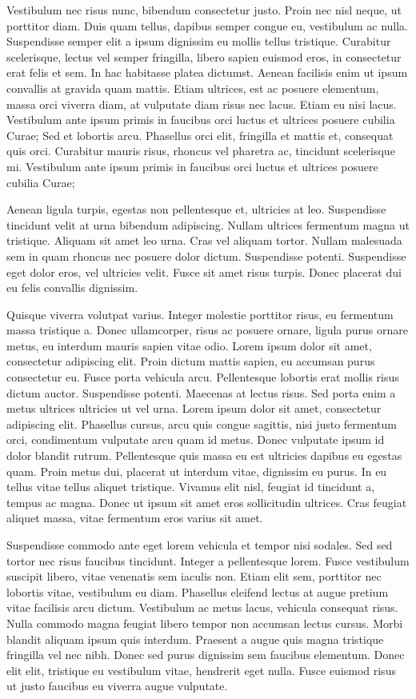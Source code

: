\documentclass[12pt,oneside,final]{siuethesis}
\theoremstyle{definition}
\begin{document}
Vestibulum nec risus nunc, bibendum consectetur justo. Proin nec nisl neque, ut porttitor diam. Duis quam tellus, dapibus semper congue eu, vestibulum ac nulla. Suspendisse semper elit a ipsum dignissim eu mollis tellus tristique. Curabitur scelerisque, lectus vel semper fringilla, libero sapien euismod eros, in consectetur erat felis et sem. In hac habitasse platea dictumst. Aenean facilisis enim ut ipsum convallis at gravida quam mattis. Etiam ultrices, est ac posuere elementum, massa orci viverra diam, at vulputate diam risus nec lacus. Etiam eu nisi lacus. Vestibulum ante ipsum primis in faucibus orci luctus et ultrices posuere cubilia Curae; Sed et lobortis arcu. Phasellus orci elit, fringilla et mattis et, consequat quis orci. Curabitur mauris risus, rhoncus vel pharetra ac, tincidunt scelerisque mi. Vestibulum ante ipsum primis in faucibus orci luctus et ultrices posuere cubilia Curae;

Aenean ligula turpis, egestas non pellentesque et, ultricies at leo. Suspendisse tincidunt velit at urna bibendum adipiscing. Nullam ultrices fermentum magna ut tristique. Aliquam sit amet leo urna. Cras vel aliquam tortor. Nullam malesuada sem in quam rhoncus nec posuere dolor dictum. Suspendisse potenti. Suspendisse eget dolor eros, vel ultricies velit. Fusce sit amet risus turpis. Donec placerat dui eu felis convallis dignissim.

Quisque viverra volutpat varius. Integer molestie porttitor risus, eu fermentum massa tristique a. Donec ullamcorper, risus ac posuere ornare, ligula purus ornare metus, eu interdum mauris sapien vitae odio. Lorem ipsum dolor sit amet, consectetur adipiscing elit. Proin dictum mattis sapien, eu accumsan purus consectetur eu. Fusce porta vehicula arcu. Pellentesque lobortis erat mollis risus dictum auctor. Suspendisse potenti. Maecenas at lectus risus. Sed porta enim a metus ultrices ultricies ut vel urna. Lorem ipsum dolor sit amet, consectetur adipiscing elit. Phasellus cursus, arcu quis congue sagittis, nisi justo fermentum orci, condimentum vulputate arcu quam id metus. Donec vulputate ipsum id dolor blandit rutrum. Pellentesque quis massa eu est ultricies dapibus eu egestas quam. Proin metus dui, placerat ut interdum vitae, dignissim eu purus. In eu tellus vitae tellus aliquet tristique. Vivamus elit nisl, feugiat id tincidunt a, tempus ac magna. Donec ut ipsum sit amet eros sollicitudin ultrices. Cras feugiat aliquet massa, vitae fermentum eros varius sit amet.




Suspendisse commodo ante eget lorem vehicula et tempor nisi sodales. Sed sed tortor nec risus faucibus tincidunt. Integer a pellentesque lorem. Fusce vestibulum suscipit libero, vitae venenatis sem iaculis non. Etiam elit sem, porttitor nec lobortis vitae, vestibulum eu diam. Phasellus eleifend lectus at augue pretium vitae facilisis arcu dictum. Vestibulum ac metus lacus, vehicula consequat risus. Nulla commodo magna feugiat libero tempor non accumsan lectus cursus. Morbi blandit aliquam ipsum quis interdum. Praesent a augue quis magna tristique fringilla vel nec nibh. Donec sed purus dignissim sem faucibus elementum. Donec elit elit, tristique eu vestibulum vitae, hendrerit eget nulla. Fusce euismod risus ut justo faucibus eu viverra augue vulputate.
\end{document}
